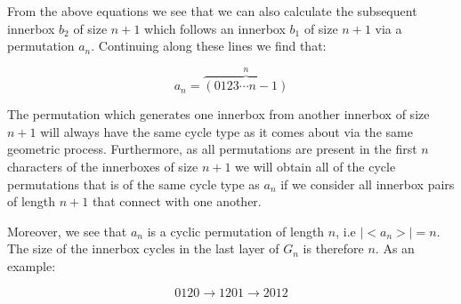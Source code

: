 \documentclass[a4paper,10pt]{article}
\begin{document}
From the above equations we see that we can also calculate the subsequent innerbox $b_2$ of size $n+1$ which follows an innerbox $b_1$ of size $n+1$ via a permutation $a_n$. Continuing along these lines we find that:

\begin{equation}
a_n = \overbrace{(0123\cdots n-1)}^n 
\end{equation}

The permutation which generates one innerbox from another innerbox of size $n+1$ will always have the same cycle type as it comes about via the same geometric process. Furthermore, as all permutations are present in the first $n$ characters of the innerboxes of size $n+1$ we will obtain all of the cycle permutations that is of the same cycle type as $a_n$ if we consider all innerbox pairs of length $n+1$ that connect with one another.

Moreover, we see that $a_n$ is a cyclic permutation of length $n$, i.e $|\!\!<\!\!a_n\!\!>\!\!|=n$. The size of the innerbox cycles in the last layer of $G_n$ is therefore $n$. As an example:

\begin{equation}
0120\rightarrow 1201 \rightarrow 2012 
\end{equation}
\end{document}

